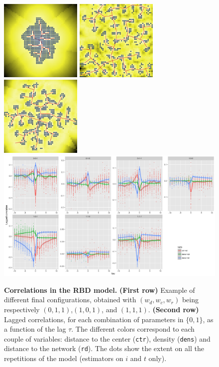 \documentclass[english]{./sageo}
\begin{document}
\begin{figure}[h]
\centering
\includegraphics[width=3.9cm]{ex_60_wdens0_wroad1_wcenter1_seed272727}
\includegraphics[width=3.9cm]{ex_60_wdens1_wroad1_wcenter0_seed272727}
\includegraphics[width=3.9cm]{ex_60_wdens1_wroad1_wcenter1_seed272727}\\\vspace{0.2cm}
\includegraphics[width=12cm]{laggedcorrs_facetextreme}
\caption{\textbf{Correlations in the RBD model.} \textbf{(First row)} Example of different final configurations, obtained with $(w_{d},w_{c},w_{r})$ being respectively $(0,1,1)$,$(1,0,1)$, and $(1,1,1)$. \textbf{(Second row)} Lagged correlations, for each combination of parameters in $\{0,1\}$, as a function of the lag $\tau$. The different colors correspond to each couple of variables: distance to the center (\texttt{ctr}), density (\texttt{dens}) and distance to the network (\texttt{rd}). The dots show the extent on all the repetitions of the model (estimators on $i$ and $t$ only).}
\label{fig:exrdb}
\end{figure}
\end{document}
